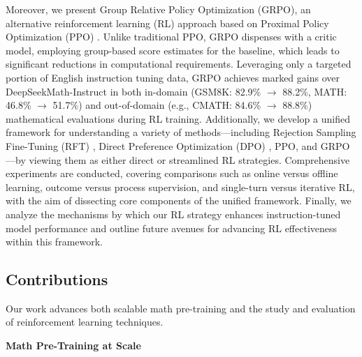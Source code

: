 Moreover, we present Group Relative Policy Optimization (GRPO), an alternative reinforcement learning (RL) approach based on Proximal Policy Optimization (PPO) \citep{schulman2017proximal}. Unlike traditional PPO, GRPO dispenses with a critic model, employing group-based score estimates for the baseline, which leads to significant reductions in computational requirements. Leveraging only a targeted portion of English instruction tuning data, GRPO achieves marked gains over DeepSeekMath-Instruct in both in-domain (GSM8K: 82.9\% $\rightarrow$ 88.2\%, MATH: 46.8\% $\rightarrow$ 51.7\%) and out-of-domain (e.g., CMATH: 84.6\% $\rightarrow$ 88.8\%) mathematical evaluations during RL training. Additionally, we develop a unified framework for understanding a variety of methods—including Rejection Sampling Fine-Tuning (RFT) \citep{yuan2023scaling}, Direct Preference Optimization (DPO) \citep{dpo}, PPO, and GRPO—by viewing them as either direct or streamlined RL strategies. Comprehensive experiments are conducted, covering comparisons such as online versus offline learning, outcome versus process supervision, and single-turn versus iterative RL, with the aim of dissecting core components of the unified framework. Finally, we analyze the mechanisms by which our RL strategy enhances instruction-tuned model performance and outline future avenues for advancing RL effectiveness within this framework.

\subsection{Contributions}
Our work advances both scalable math pre-training and the study and evaluation of reinforcement learning techniques.

\textbf{Math Pre-Training at Scale}

